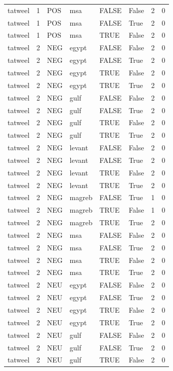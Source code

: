 \begin{tabular}{llllllrr}
tatweel & 1 & POS & msa & FALSE & False & 2 & 0 \\
tatweel & 1 & POS & msa & FALSE & True & 2 & 0 \\
tatweel & 1 & POS & msa & TRUE & False & 2 & 0 \\
tatweel & 2 & NEG & egypt & FALSE & False & 2 & 0 \\
tatweel & 2 & NEG & egypt & FALSE & True & 2 & 0 \\
tatweel & 2 & NEG & egypt & TRUE & False & 2 & 0 \\
tatweel & 2 & NEG & egypt & TRUE & True & 2 & 0 \\
tatweel & 2 & NEG & gulf & FALSE & False & 2 & 0 \\
tatweel & 2 & NEG & gulf & FALSE & True & 2 & 0 \\
tatweel & 2 & NEG & gulf & TRUE & False & 2 & 0 \\
tatweel & 2 & NEG & gulf & TRUE & True & 2 & 0 \\
tatweel & 2 & NEG & levant & FALSE & False & 2 & 0 \\
tatweel & 2 & NEG & levant & FALSE & True & 2 & 0 \\
tatweel & 2 & NEG & levant & TRUE & False & 2 & 0 \\
tatweel & 2 & NEG & levant & TRUE & True & 2 & 0 \\
tatweel & 2 & NEG & magreb & FALSE & True & 1 & 0 \\
tatweel & 2 & NEG & magreb & TRUE & False & 1 & 0 \\
tatweel & 2 & NEG & magreb & TRUE & True & 2 & 0 \\
tatweel & 2 & NEG & msa & FALSE & False & 2 & 0 \\
tatweel & 2 & NEG & msa & FALSE & True & 2 & 0 \\
tatweel & 2 & NEG & msa & TRUE & False & 2 & 0 \\
tatweel & 2 & NEG & msa & TRUE & True & 2 & 0 \\
tatweel & 2 & NEU & egypt & FALSE & False & 2 & 0 \\
tatweel & 2 & NEU & egypt & FALSE & True & 2 & 0 \\
tatweel & 2 & NEU & egypt & TRUE & False & 2 & 0 \\
tatweel & 2 & NEU & egypt & TRUE & True & 2 & 0 \\
tatweel & 2 & NEU & gulf & FALSE & False & 2 & 0 \\
tatweel & 2 & NEU & gulf & FALSE & True & 2 & 0 \\
tatweel & 2 & NEU & gulf & TRUE & False & 2 & 0 \\

\end{tabular}
